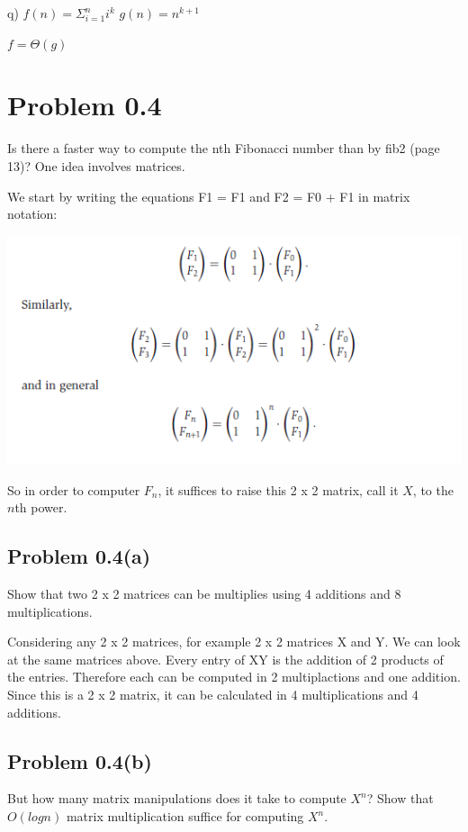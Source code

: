 \documentclass{article}
\begin{document}
q) $f(n) = \Sigma^{n}_{i=1}i^{k}$ $g(n) = n^{k+1}$ 

$f = \Theta(g)$

\section{Problem 0.4}
Is there a faster way to compute the nth Fibonacci number than by fib2 (page 13)? One idea
involves matrices.

We start by writing the equations F1 = F1 and F2 = F0 + F1 in matrix notation:

\begin{center}
\includegraphics{Screenshot(169)}
\end{center}

So in order to computer $F_{n}$, it suffices to raise this 2 x 2 matrix, call it $X$, to the $n$th power. 
\subsection{Problem 0.4(a)}
Show that two 2 x 2 matrices can be multiplies using 4 additions and 8 multiplications.
\vspace{2mm}

Considering any 2 x 2 matrices, for example 2 x 2 matrices X and Y. We can look at the same matrices above. Every entry of XY is the addition of 2 products of the entries. Therefore each can be computed in 2 multiplactions and one addition. Since this is a 2 x 2 matrix, it can be calculated in 4 multiplications and 4 additions.
\subsection{Problem 0.4(b)}
But how many matrix manipulations does it take to compute $X^{n}$? Show that $O(logn)$ matrix multiplication suffice for computing $X^{n}$.
\vspace{2mm}
\end{document}
